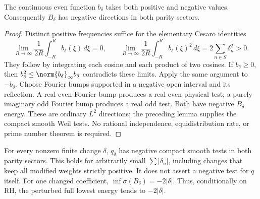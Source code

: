\begin{lemma}\label{lem:ns57-symbol-signs}
The continuous even function $b_\delta$ takes both positive and negative
values. Consequently $B_\delta$ has negative directions in both parity sectors.
\end{lemma}
\begin{proof}
Distinct positive frequencies suffice for the elementary Cesaro identities
\[
 \lim_{R\to\infty}\frac1{2R}\int_{-R}^R b_\delta(\xi)\,d\xi=0,
 \qquad
 \lim_{R\to\infty}\frac1{2R}\int_{-R}^R b_\delta(\xi)^2\,d\xi
       =2\sum_{n\in S}\delta_n^2>0.
\]
They follow by integrating each cosine and each product of two cosines.
If $b_\delta\ge0$, then $b_\delta^2\le\norm{b_\delta}_\infty b_\delta$
contradicts these limits. Apply the same argument to $-b_\delta$.
Choose Fourier bumps supported in a negative open interval and its
reflection. A real even Fourier bump produces a real even physical
test; a purely imaginary odd Fourier bump produces a real odd test.
Both have negative $B_\delta$ energy. These are ordinary $L^2$
directions; the preceding lemma supplies the compact smooth Weil tests.
No rational independence, equidistribution rate, or prime number theorem
is required.
\end{proof}

\begin{corollary}\label{cor:ns57-finite-weight-negative}
For every nonzero finite change $\delta$, $q_\delta$ has negative compact
smooth tests in both parity sectors. This holds for arbitrarily small
$\sum|\delta_n|$, including changes that keep all modified weights
strictly positive. It does not assert a negative test for $q$ itself.
For one changed coefficient, $\inf\sigma(B_\delta)=-2|\delta|$.
Thus, conditionally on RH, the perturbed full lowest energy tends
to $-2|\delta|$.
\end{corollary}


